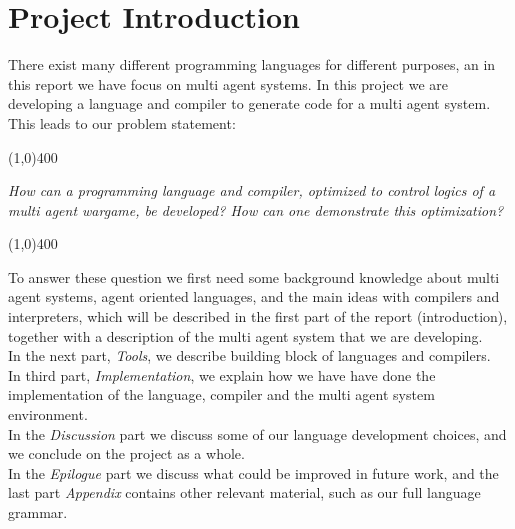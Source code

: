 \chapter*{Project Introduction}

There exist many different programming languages for different purposes, an in this report we have focus on multi agent systems. In this project we are developing a language and compiler to generate code for a multi agent system. This leads to our problem statement:
\begin{center}
\line(1,0){400}
\end{center}
	\textit{How can a programming language and compiler, optimized to control logics of a multi agent wargame, be developed? How can one demonstrate this optimization?}
\begin{center}
\line(1,0){400}
\end{center}
To answer these question we first need some background knowledge about multi agent systems, agent oriented languages, and the main ideas with compilers and interpreters, which will be described in the first part of the report (introduction), together with a description of the multi agent system that we are developing.\\ \indent
In the next part, \textit{Tools}, we describe building block of languages and compilers.\\ \indent
In third part, \textit{Implementation}, we explain how we have have done the implementation of the language, compiler and the multi agent system environment.\\ \indent
In the \textit{Discussion} part we discuss some of our language development choices, and we conclude on the project as a whole.\\ \indent
In the \textit{Epilogue} part we discuss what could be improved in future work, and the last part \textit{Appendix} contains other relevant material, such as our full language grammar.